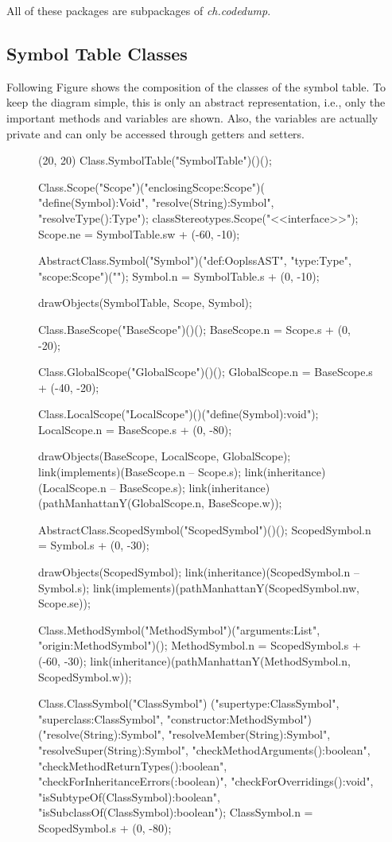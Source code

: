 All of these packages are subpackages of \emph{ch.codedump}.

\subsection{Symbol Table Classes}

Following Figure shows the composition of the classes of the symbol table.
To keep the diagram simple, this is only an abstract representation, i.e., only
the important methods and variables are shown. Also, the variables are actually
private and can only be accessed through getters and setters.

\begin{figure}[H]
	\centering
	\begin{emp}[classdiag](20, 20)
	Class.SymbolTable("SymbolTable")()();

	Class.Scope("Scope")("enclosingScope:Scope")( "define(Symbol):Void",
			"resolve(String):Symbol", "resolveType():Type");
	classStereotypes.Scope("<<interface>>");
	Scope.ne = SymbolTable.sw + (-60, -10);

	AbstractClass.Symbol("Symbol")("def:OoplssAST", "type:Type", "scope:Scope")("");
	Symbol.n = SymbolTable.s + (0, -10);

	drawObjects(SymbolTable, Scope, Symbol);

	Class.BaseScope("BaseScope")()();
	BaseScope.n = Scope.s + (0, -20);

	Class.GlobalScope("GlobalScope")()();
	GlobalScope.n = BaseScope.s + (-40, -20);

	Class.LocalScope("LocalScope")()("define(Symbol):void");
	LocalScope.n = BaseScope.s + (0, -80);

	drawObjects(BaseScope, LocalScope, GlobalScope);
	link(implements)(BaseScope.n -- Scope.s);
	link(inheritance)(LocalScope.n -- BaseScope.s);
	link(inheritance)(pathManhattanY(GlobalScope.n, BaseScope.w));

	AbstractClass.ScopedSymbol("ScopedSymbol")()();
	ScopedSymbol.n = Symbol.s + (0, -30);

	drawObjects(ScopedSymbol);
	link(inheritance)(ScopedSymbol.n -- Symbol.s);
	link(implements)(pathManhattanY(ScopedSymbol.nw, Scope.se));

	Class.MethodSymbol("MethodSymbol")("arguments:List", "origin:MethodSymbol")();
	MethodSymbol.n = ScopedSymbol.s + (-60, -30);
	link(inheritance)(pathManhattanY(MethodSymbol.n, ScopedSymbol.w));

	Class.ClassSymbol("ClassSymbol")
		("supertype:ClassSymbol", "superclass:ClassSymbol", "constructor:MethodSymbol")
		("resolve(String):Symbol", "resolveMember(String):Symbol",
		"resolveSuper(String):Symbol",
		"checkMethodArguments():boolean", "checkMethodReturnTypes():boolean",
		"checkForInheritanceErrors(:boolean)", "checkForOverridings():void",
		"isSubtypeOf(ClassSymbol):boolean", "isSubclassOf(ClassSymbol):boolean");
	ClassSymbol.n = ScopedSymbol.s + (0, -80);


\end{emp}
\end{figure}
